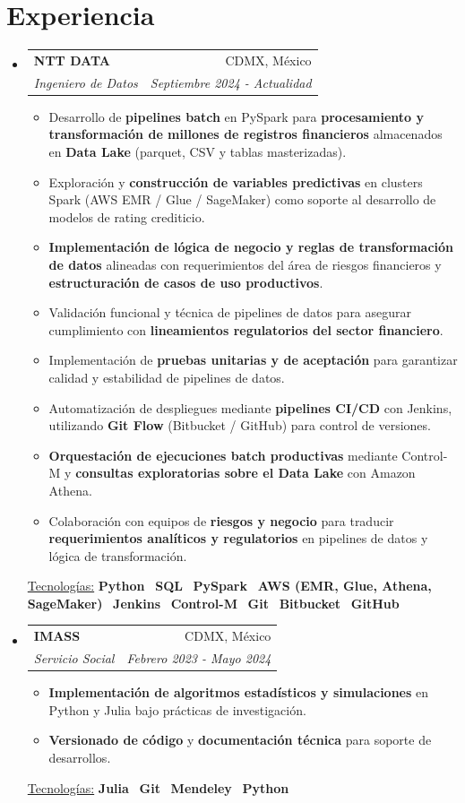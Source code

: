 \documentclass[letterpaper,11pt]{article}
\makeatletter
\newcommand{\sepsection}{\vspace{25pt}}
\newcommand{\resumeItem}[1]{%
	\item\small{
		#1
	}
}
\newcommand{\resumeSubheading}[4]{
	\vspace{3pt}\item%
	\begin{tabular*}{0.97\textwidth}[t]{l@{\extracolsep{\fill}}r}
		\textbf{#1} & #2 \\
		\textit{\small#3} & \textit{\small #4} \\
	\end{tabular*}\vspace{-5pt}
}
\newcommand{\resumeSubHeadingListStart}{\begin{itemize}[leftmargin=*]}
\newcommand{\resumeSubHeadingListEnd}{\end{itemize}}
\newcommand{\resumeItemListStart}{\begin{itemize}}
\newcommand{\resumeItemListEnd}{\end{itemize}\vspace{-5pt}}
\newcommand{\resumeTech}[2]{
	\underline{#1:} #2
}
\makeatother
\begin{document}
		\section{Experiencia}
		\resumeSubHeadingListStart
		\resumeSubheading
		{NTT DATA}{CDMX, México}
		{Ingeniero de Datos}{Septiembre 2024 - Actualidad}
		\resumeItemListStart
		\resumeItem{Desarrollo de \textbf{pipelines batch} en PySpark para \textbf{procesamiento y transformación de millones de registros financieros} almacenados en \textbf{Data Lake} (parquet, CSV y tablas masterizadas).}
		\resumeItem{Exploración y \textbf{construcción de variables predictivas} en clusters Spark (AWS EMR / Glue / SageMaker) como soporte al desarrollo de modelos de rating crediticio.}
		\resumeItem{\textbf{Implementación de lógica de negocio y reglas de transformación de datos} alineadas con requerimientos del área de riesgos financieros y \textbf{estructuración de casos de uso productivos}.}
		\resumeItem{Validación funcional y técnica de pipelines de datos para asegurar cumplimiento con \textbf{lineamientos regulatorios del sector financiero}.}
		\resumeItem{Implementación de \textbf{pruebas unitarias y de aceptación} para garantizar calidad y estabilidad de pipelines de datos.}
		\resumeItem{Automatización de despliegues mediante \textbf{pipelines CI/CD} con Jenkins, utilizando \textbf{Git Flow} (Bitbucket / GitHub) para control de versiones.}
		\resumeItem{\textbf{Orquestación de ejecuciones batch productivas} mediante Control-M y \textbf{consultas exploratorias sobre el Data Lake} con Amazon Athena.}
		\resumeItem{Colaboración con equipos de \textbf{riesgos y negocio} para traducir \textbf{requerimientos analíticos y regulatorios} en pipelines de datos y lógica de transformación.}
		\resumeItemListEnd
		\resumeTech{Tecnologías}{\textbf{Python}  \textbar\  \textbf{SQL}  \textbar\  \textbf{PySpark}  \textbar\  \textbf{AWS (EMR, Glue, Athena, SageMaker)}  \textbar\  \textbf{Jenkins}  \textbar\  \textbf{Control-M}  \textbar\  \textbf{Git}  \textbar\  \textbf{Bitbucket}  \textbar\  \textbf{GitHub}}
		
		\resumeSubheading
		{IMASS}{CDMX, México}
		{Servicio Social}{Febrero 2023 - Mayo 2024}
		\resumeItemListStart
		\resumeItem{\textbf{Implementación de algoritmos estadísticos y simulaciones} en Python y Julia bajo prácticas de investigación.}
		\resumeItem{\textbf{Versionado de código} y \textbf{documentación técnica} para soporte de desarrollos.}
		\resumeItemListEnd
		\resumeTech{Tecnologías}{\textbf{Julia}  \textbar\  \textbf{Git}  \textbar\  \textbf{Mendeley}  \textbar\  \textbf{Python}}
		\resumeSubHeadingListEnd
\end{document}
